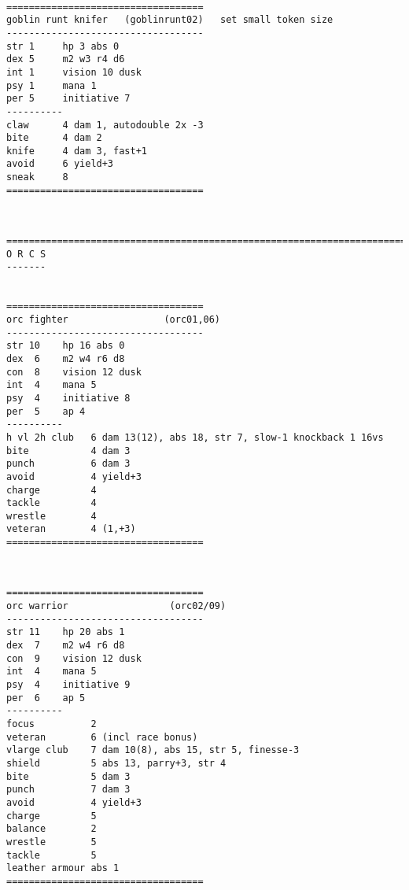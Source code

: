 \

\goodbreak \begin{samepage} \small \begin{verbatim}
===================================
goblin runt knifer   (goblinrunt02)   set small token size
-----------------------------------
str 1     hp 3 abs 0
dex 5     m2 w3 r4 d6
int 1     vision 10 dusk
psy 1     mana 1
per 5     initiative 7
----------
claw      4 dam 1, autodouble 2x -3
bite      4 dam 2
knife     4 dam 3, fast+1
avoid     6 yield+3
sneak     8
===================================
\end{verbatim} \normalsize \end{samepage}

\








\goodbreak
{}

\goodbreak \begin{samepage} \small \begin{verbatim}
================================================================================
O R C S
-------


===================================
orc fighter                 (orc01,06)
-----------------------------------
str 10    hp 16 abs 0
dex  6    m2 w4 r6 d8
con  8    vision 12 dusk
int  4    mana 5
psy  4    initiative 8
per  5    ap 4
----------
h vl 2h club   6 dam 13(12), abs 18, str 7, slow-1 knockback 1 16vs
bite           4 dam 3
punch          6 dam 3
avoid          4 yield+3
charge         4
tackle         4
wrestle        4
veteran        4 (1,+3)
===================================
\end{verbatim} \normalsize \end{samepage}

\

\goodbreak \begin{samepage} \small \begin{verbatim}
===================================
orc warrior                  (orc02/09)
-----------------------------------
str 11    hp 20 abs 1
dex  7    m2 w4 r6 d8
con  9    vision 12 dusk
int  4    mana 5
psy  4    initiative 9
per  6    ap 5
----------
focus          2
veteran        6 (incl race bonus)
vlarge club    7 dam 10(8), abs 15, str 5, finesse-3
shield         5 abs 13, parry+3, str 4
bite           5 dam 3
punch          7 dam 3
avoid          4 yield+3
charge         5
balance        2
wrestle        5
tackle         5
leather armour abs 1
===================================
\end{verbatim} \normalsize \end{samepage}

